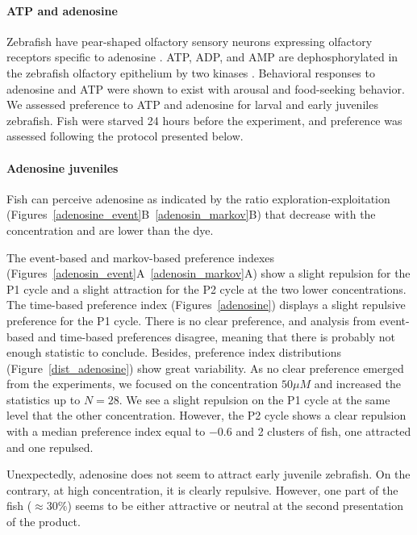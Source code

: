   \paragraph{ATP and adenosine}
  Zebrafish have pear-shaped olfactory sensory neurons expressing olfactory receptors specific to adenosine \cite{wakisaka2017adenosine}. ATP, ADP, and AMP are dephosphorylated in the zebrafish olfactory epithelium by two kinases \cite{wakisaka2017adenosine}. Behavioral responses to adenosine and ATP were shown to exist with arousal and food-seeking behavior. We assessed preference to ATP and adenosine for larval and early juveniles zebrafish. Fish were starved 24 hours before the experiment, and preference was assessed following the protocol presented below.

  \paragraph{Adenosine juveniles} Fish can perceive adenosine as indicated by the ratio exploration-exploitation (Figures~\ref{adenosine_event}B~\ref{adenosin_markov}B) that decrease with the concentration and are lower than the dye.

  The event-based and markov-based preference indexes (Figures~\ref{adenosin_event}A~\ref{adenosin_markov}A) show a slight repulsion for the P1 cycle and a slight attraction for the P2 cycle at the two lower concentrations.  The time-based preference index (Figures~\ref{adenosine}) displays a slight repulsive preference for the P1 cycle. There is no clear preference, and analysis from event-based and time-based preferences disagree, meaning that there is probably not enough statistic to conclude. Besides, preference index distributions (Figure~\ref{dist_adenosine}) show great variability. As no clear preference emerged from the experiments, we focused on the concentration $50 \mu M$ and increased the statistics up to $N=28$. We see a slight repulsion on the P1 cycle at the same level that the other concentration. However, the P2 cycle shows a clear repulsion with a median preference index equal to $-0.6$ and 2 clusters of fish, one attracted and one repulsed.

  Unexpectedly, adenosine does not seem to attract early juvenile zebrafish. On the contrary, at high concentration, it is clearly repulsive. However, one part of the fish ($\approx 30 \%$) seems to be either attractive or neutral at the second presentation of the product.

